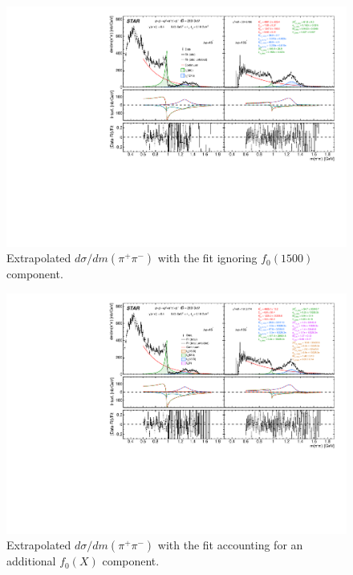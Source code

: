 \begin{figure}%
\centering
\includegraphics[width=\textwidth,page=1]{graphics/physicsResults/InvMassFit/NO_F01500/RatioAndInterference_PiPiInvMass_Fit.pdf}
%
\caption{Extrapolated $d\sigma/dm(\pi^{+}\pi^{-})$ with the fit ignoring $f_{0}(1500)$ component.}
\label{invMassFit_NO_F01500}
\end{figure}

\begin{figure}%
\centering
\includegraphics[width=\textwidth,page=1]{graphics/physicsResults/InvMassFit/EXTRA_RESONANCE/RatioAndInterference_PiPiInvMass_Fit.pdf}
%
\caption{Extrapolated $d\sigma/dm(\pi^{+}\pi^{-})$ with the fit accounting for an additional $f_{0}(X)$ component.}
\label{invMassFit_EXTRA_RESONANCE}
\end{figure}


